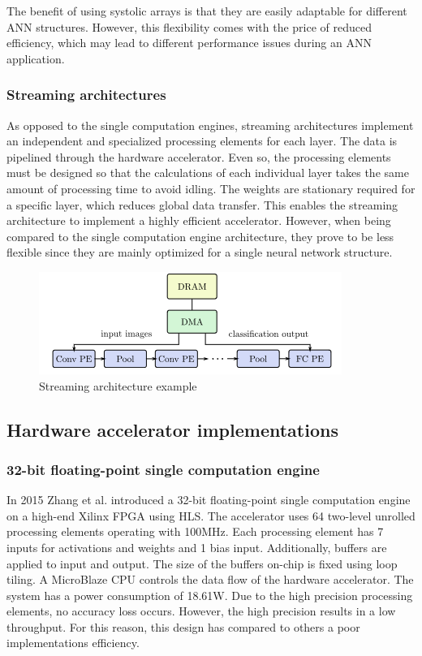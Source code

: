 The benefit of using systolic arrays is that they are easily adaptable for different ANN structures. However, this flexibility comes with the price of reduced efficiency, which may lead to different performance issues during an ANN application.

\subsubsection{Streaming architectures}
As opposed to the single computation engines, streaming architectures implement an independent and specialized processing elements for each layer. The data is pipelined through the hardware accelerator. Even so, the processing elements must be designed so that the calculations of each individual layer takes the same amount of processing time to avoid idling. The weights are stationary required for a specific layer, which reduces global data transfer\cite{learningOnHardware}. This enables the streaming architecture to implement a highly efficient accelerator. However, when being compared to the single computation engine architecture, they prove to be less flexible since they are mainly optimized for a single neural network structure\cite{learningOnHardware}.

\begin{figure}[H]
    \centering
    \includegraphics[width=0.7\linewidth]{img/streamingArhitecture.png}
    \caption{Streaming architecture example\cite{learningOnHardware}}
    \label{fig:streamingArchitecture}
\end{figure}

\subsection{Hardware accelerator implementations}

\subsubsection{32-bit floating-point single computation engine \cite{exampleFPGA2}}
In 2015 Zhang et al. introduced a 32-bit floating-point single computation engine on a high-end Xilinx FPGA using HLS. The accelerator uses 64 two-level unrolled processing elements operating with 100MHz. Each processing element has 7 inputs for activations and weights and 1 bias input. Additionally, buffers are applied to input and output. The size of the buffers on-chip is fixed using loop tiling. A MicroBlaze CPU controls the data flow of the hardware accelerator. The system has a power consumption of 18.61W. Due to the high precision processing elements, no accuracy loss occurs. However, the high precision results in a low throughput. For this reason, this design has compared to others a poor implementations efficiency.


